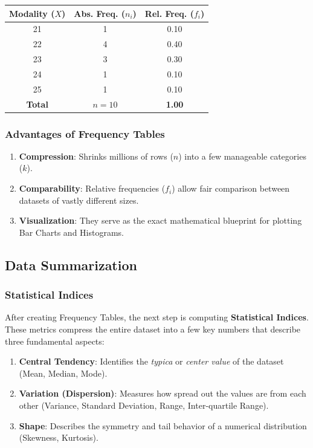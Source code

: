 \begin{center}
\renewcommand{\arraystretch}{1.2}
\begin{tabular}{|c|c|c|}
    \hline
    \textbf{Modality ($X$)} & \textbf{Abs. Freq. ($n_i$)} & \textbf{Rel. Freq. ($f_i$)} \\
    \hline
    21 & 1 & 0.10 \\
    22 & 4 & 0.40 \\
    23 & 3 & 0.30 \\
    24 & 1 & 0.10 \\
    25 & 1 & 0.10 \\
    \hline
    \textbf{Total} & \textbf{$n=10$} & \textbf{1.00} \\
    \hline
\end{tabular}
\end{center}

\vspace{0.3cm}
\subsubsection{Advantages of Frequency Tables}
\begin{enumerate}
    \item \textbf{Compression}: Shrinks millions of rows ($n$) into a few manageable categories ($k$).
    \item \textbf{Comparability}: Relative frequencies ($f_i$) allow fair comparison between datasets of vastly different sizes.
    \item \textbf{Visualization}: They serve as the exact mathematical blueprint for plotting Bar Charts and Histograms.
\end{enumerate}

\subsection{Data Summarization}

\subsubsection{Statistical Indices}

After creating Frequency Tables, the next step is computing \textbf{Statistical Indices}. These metrics compress the entire dataset into a few key numbers that describe three fundamental aspects:

\begin{enumerate}
    \item \textbf{Central Tendency}: Identifies the \textit{typica} or \textit{center value} of the dataset (Mean, Median, Mode).
    \item \textbf{Variation (Dispersion)}: Measures how spread out the values are from each other (Variance, Standard Deviation, Range, Inter-quartile Range).
    \item \textbf{Shape}: Describes the symmetry and tail behavior of a numerical distribution (Skewness, Kurtosis).
\end{enumerate}

